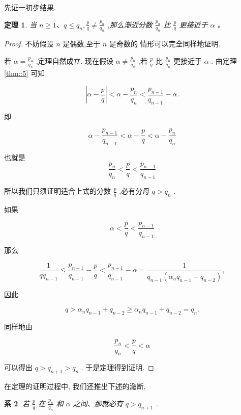 \documentclass{ctexart}
\newtheorem{theorem}{\indent 定理}[section]
\newtheorem{corollary}[theorem]{\indent 系}
\begin{document}
先证一初步结果.

\begin{theorem}
  \label{thm:8}
  当 \(n \geq 1\text{、}q \leq {q}_{n},\frac{p}{q} \neq \frac{{p}_{n}}{{q}_{n}}\) ,那么渐近分数 \(\frac{{p}_{n}}{{q}_{n}}\) 比 \(\frac{p}{q}\) 更接近于 \(\alpha\) 。
\end{theorem}

\begin{proof}
  不妨假设 \(n\) 是偶数,至于 \(n\) 是奇数的 情形可以完全同样地证明.

若 \(\alpha = \frac{{p}_{n}}{{q}_{n}}\) ,定理自然成立. 现在假设 \(\alpha \ne \frac{{p}_{n}}{{q}_{n}}\) ,若 \(\frac{p}{q}\) 比 \(\frac{{p}_{n}}{{q}_{n}}\) 更接近于 \(\alpha\) . 由定理 \ref{thm::5} 可知

\[
\left| {\alpha -\frac{p}{q}}\right| < \alpha - \frac{{p}_{n}}{{q}_{n}} < \frac{{p}_{n - 1}}{{q}_{n - 1}}-\alpha .
\]

即

\[
\alpha - \frac{{p}_{n - 1}}{{q}_{n - 1}} < \alpha - \frac{p}{q} < \alpha - \frac{{p}_{n}}{{q}_{n}}
\]

也就是
\begin{equation}
\label{eq:7}
\frac{{p}_{n}}{{q}_{n}} < \frac{p}{q} < \frac{{p}_{n - 1}}{{q}_{n - 1}} \tag{2}
\end{equation}

所以我们只须证明适合上式的分数 \(\frac{p}{q}\) ,必有分母 \(q > {q}_{n}\) .

如果

\[
\alpha < \frac{p}{q} < \frac{{p}_{n - 1}}{{q}_{n - 1}}
\]

那么

\[
\frac{1}{q{q}_{n - 1}} \leq \frac{{p}_{n - 1}}{{q}_{n - 1}} - \frac{p}{q} < \frac{{p}_{n - 1}}{{q}_{n - 1}} - \alpha = \frac{1}{{q}_{n - 1}\left( {{\alpha}_{n}{q}_{n - 1} + {q}_{n - 2}}\right) },
\]

因此

\[
q > {\alpha }_{n}{q}_{n - 1} + {q}_{n - 2} \geq {\alpha}_{n}{q}_{n - 1} + {q}_{n - 2} = {q}_{n}.
\]

同样地由

\[
\frac{{p}_{n}}{{q}_{n}} < \frac{p}{q} < \alpha
\]

可以得出 \(q > {q}_{n + 1} > {q}_{n}\) . 于是定理得到证明.
\end{proof}


在定理的证明过程中, 我们还推出下述的渝断,

\begin{corollary}
  \label{cor:8.1}
  若 \(\frac{p}{q}\) 在 \(\frac{{p}_{n}}{{q}_{n}}\) 和 \(\alpha\) 之间、那就必有 \(q > {q}_{n + 1}\) .
\end{corollary}
\end{document}
